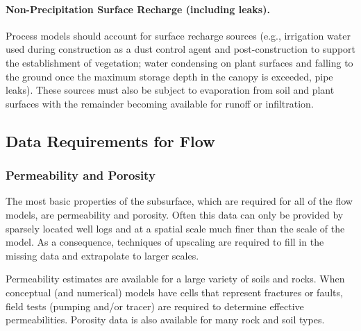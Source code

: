 

\paragraph{Non-Precipitation Surface Recharge (including leaks).} 
Process models should account for surface recharge sources (e.g., irrigation water used
during construction as a dust control agent and post-construction to
support the establishment of vegetation; water condensing on plant
surfaces and falling to the ground once the maximum storage depth in
the canopy is exceeded, pipe leaks).  
These sources must also be subject to evaporation from soil and plant surfaces with the remainder
becoming available for runoff or infiltration.





%
%

\subsection{Data Requirements for Flow}

\subsubsection{Permeability and Porosity}

The most basic properties of the subsurface, which are required for
all of the flow models, are permeability and porosity.  Often this
data can only be provided by sparsely located well logs and at a
spatial scale much finer than the scale of the model. As a
consequence, techniques of upscaling are required to fill in the
missing data and extrapolate to larger scales.

Permeability estimates are available for a large variety of soils and
rocks. When conceptual (and numerical) models have cells that
represent fractures or faults, field tests (pumping and/or tracer) are
required to determine effective permeabilities. Porosity data is also
available for many rock and soil types.


